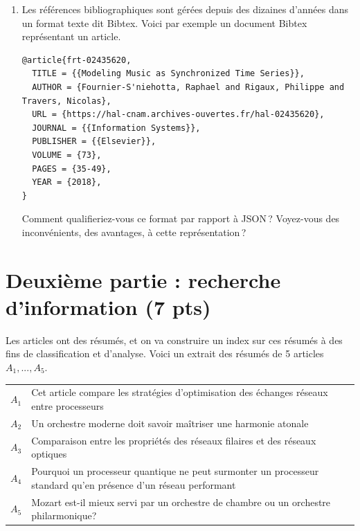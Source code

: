 \documentclass[11pt,a4paper]{article}
\begin{document}
\begin{enumerate}
   Dessinez cette hiérarchie, et proposez une modélisation JSON pour ajouter l'information
   sur les organismes dans la représentation B. Illustrez cette modélisation
   sur le document "Vertigo" de la seconde question.

     \item Les références bibliographiques sont gérées depuis des dizaines d'années dans
       un format texte dit Bibtex. Voici par exemple
       un document Bibtex représentant un article.

\begin{verbatim}
@article{frt-02435620,
  TITLE = {{Modeling Music as Synchronized Time Series}},
  AUTHOR = {Fournier-S'niehotta, Raphael and Rigaux, Philippe and Travers, Nicolas},
  URL = {https://hal-cnam.archives-ouvertes.fr/hal-02435620},
  JOURNAL = {{Information Systems}},
  PUBLISHER = {{Elsevier}},
  VOLUME = {73},
  PAGES = {35-49},
  YEAR = {2018},
}
\end{verbatim}

       Comment qualifieriez-vous ce format par rapport à JSON\,? Voyez-vous
        des inconvénients, des avantages, à cette représentation\,?

\end{enumerate}


\section*{Deuxième partie : recherche d'information (7 pts)}

Les articles ont des résumés, et on va construire un index sur ces résumés à des fins
de classification et d'analyse. Voici un extrait des résumés de 5 articles
$A_1, ..., A_5$.
\vspace*{0.3cm}

\begin{tabular}{lp{15cm}}
     $A_1$& Cet article compare les stratégies d'optimisation des échanges réseaux entre processeurs\\
     $A_2$& Un orchestre moderne doit savoir maîtriser une harmonie atonale\\
     $A_3$& Comparaison entre les propriétés des réseaux filaires et des réseaux optiques\\
     $A_4$& Pourquoi un processeur quantique ne peut surmonter un processeur standard
         qu'en présence d'un réseau performant\\
     $A_5$& Mozart est-il mieux servi par un orchestre de chambre ou un orchestre philarmonique?\\
\end{tabular}
\end{document}
